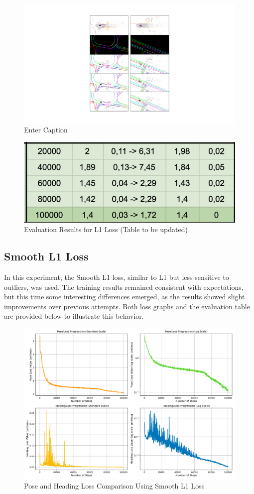 \begin{figure}
    \centering
    \includegraphics[width=1\linewidth]{LateX//figs/IMMAGINI_L1_rete.pdf}
    \caption{Enter Caption}
    \label{fig:enter-label}
\end{figure}

\begin{figure}[H]
    \centering
    \includegraphics[width=0.5\linewidth]{LateX//figs/tabella_l1.png}
    \caption{Evaluation Results for L1 Loss (Table to be updated)}
    \label{fig:l1-loss-results}
\end{figure}

\subsection*{Smooth L1 Loss}
In this experiment, the Smooth L1 loss, similar to L1 but less sensitive to outliers, was used. The training results remained consistent with expectations, but this time some interesting differences emerged, as the results showed slight improvements over previous attempts. Both loss graphs and the evaluation table are provided below to illustrate this behavior.

\begin{figure}[H]
    \centering
    \includegraphics[width=0.75\linewidth]{LateX//figs/l1s_pose_heading_loss_comparison.png}
    \caption{Pose and Heading Loss Comparison Using Smooth L1 Loss}
    \label{fig:smooth-l1-pose-heading-loss}
\end{figure}

